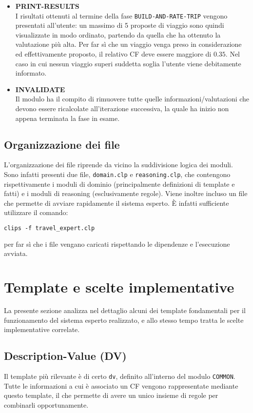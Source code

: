 \begin{itemize}
\item \textbf{PRINT-RESULTS}\\
I risultati ottenuti al termine della fase \texttt{BUILD-AND-RATE-TRIP} vengono presentati all'utente: un massimo di 5 proposte di viaggio sono quindi visualizzate in modo ordinato, partendo da quella che ha ottenuto la valutazione più alta. Per far sì che un viaggio venga preso in considerazione ed effettivamente proposto, il relativo CF deve essere maggiore di $0.35$. Nel caso in cui nessun viaggio superi suddetta soglia l'utente viene debitamente informato.
\item \textbf{INVALIDATE}\\
Il modulo ha il compito di rimuovere tutte quelle informazioni/valutazioni che devono essere ricalcolate all'iterazione successiva, la quale ha inizio non appena terminata la fase in esame.
\end{itemize}

\subsection{Organizzazione dei file}
L'organizzazione dei file riprende da vicino la suddivisione logica dei moduli. Sono infatti presenti due file, \texttt{domain.clp} e \texttt{reasoning.clp}, che contengono rispettivamente i moduli di dominio (principalmente definizioni di template e fatti) e i moduli di reasoning (esclusivamente regole).
Viene inoltre incluso un file che permette di avviare rapidamente il sistema esperto. È infatti sufficiente utilizzare il comando:
\begin{center}
\texttt{clips -f travel\_expert.clp}
\end{center}
per far sì che i file vengano caricati rispettando le dipendenze e l'esecuzione avviata.

\section{Template e scelte implementative}

La presente sezione analizza nel dettaglio alcuni dei template fondamentali per il funzionamento del sistema esperto realizzato, e allo stesso tempo tratta le scelte implementative correlate.

\subsection{Description-Value (DV)}

Il template più rilevante è di certo \texttt{dv}, definito all'interno del modulo \texttt{COMMON}. Tutte le informazioni a cui è associato un CF vengono rappresentate mediante questo template, il che permette di avere un unico insieme di regole per combinarli opportunamente.

